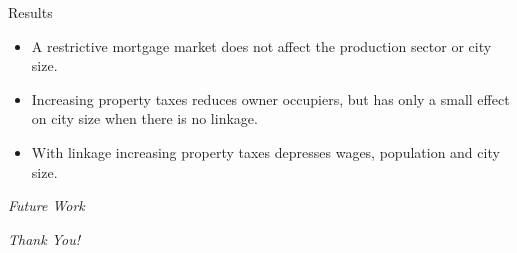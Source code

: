 \documentclass[notes=show]{beamer} %
\begin{document}
\begin{frame}{Results} \Large
\begin {itemize}[<+-|alert@+>]
\item A restrictive mortgage market does not affect the production sector or city size.

\item  Increasing property taxes reduces owner occupiers, but has only a small effect on city size when there is no linkage. 
 
\item  With linkage increasing property taxes depresses wages, population and city size.
\end{itemize}
\end{frame}%

\begin{frame}{}
  \centering \Large
  \emph{Future Work}
\end{frame}

\begin{frame}{}
  \centering \Large
  \emph{Thank You!}
\end{frame}
\end{document}
